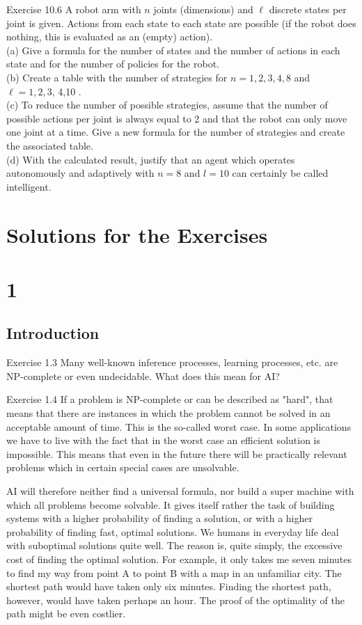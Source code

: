 \documentclass[10pt]{article}
\begin{document}
Exercise 10.6 A robot arm with $n$ joints (dimensions) and $\ell$ discrete states per joint is given. Actions from each state to each state are possible (if the robot does nothing, this is evaluated as an (empty) action).\\
(a) Give a formula for the number of states and the number of actions in each state and for the number of policies for the robot.\\
(b) Create a table with the number of strategies for $n=1,2,3,4,8$ and $\ell=1,2,3$, 4,10 .\\
(c) To reduce the number of possible strategies, assume that the number of possible actions per joint is always equal to 2 and that the robot can only move one joint at a time. Give a new formula for the number of strategies and create the associated table.\\
(d) With the calculated result, justify that an agent which operates autonomously and adaptively with $n=8$ and $l=10$ can certainly be called intelligent.

\section*{Solutions for the Exercises}
\section*{1}
\subsection*{Introduction}
Exercise 1.3 Many well-known inference processes, learning processes, etc. are NP-complete or even undecidable. What does this mean for AI?

Exercise 1.4 If a problem is NP-complete or can be described as "hard", that means that there are instances in which the problem cannot be solved in an acceptable amount of time. This is the so-called worst case. In some applications we have to live with the fact that in the worst case an efficient solution is impossible. This means that even in the future there will be practically relevant problems which in certain special cases are unsolvable.

AI will therefore neither find a universal formula, nor build a super machine with which all problems become solvable. It gives itself rather the task of building systems with a higher probability of finding a solution, or with a higher probability of finding fast, optimal solutions. We humans in everyday life deal with suboptimal solutions quite well. The reason is, quite simply, the excessive cost of finding the optimal solution. For example, it only takes me seven minutes to find my way from point A to point B with a map in an unfamiliar city. The shortest path would have taken only six minutes. Finding the shortest path, however, would have taken perhaps an hour. The proof of the optimality of the path might be even costlier.
\end{document}
